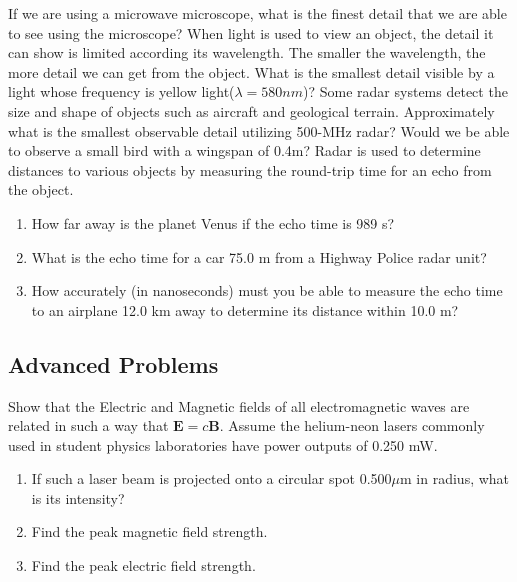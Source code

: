 \documentclass[11pt,addpoints]{exam}
\begin{document}
	\begin{questions}
		\question If we are using a microwave microscope, what is the finest detail that we are able to see using the microscope?
		\question When light is used to view an object, the detail it can show is limited according its wavelength. The smaller the wavelength, the more detail we can get from the object. What is the smallest detail visible by a light whose frequency is yellow light($\lambda=580nm$)? 
		\question Some radar systems detect the size and shape of objects such as aircraft and geological terrain. Approximately what is the smallest observable detail utilizing 500-MHz radar? Would we be able to observe a small bird with a wingspan of 0.4m?
		\question Radar is used to determine distances to various objects by measuring the round-trip time for an echo from the object.
		\begin{enumerate}[label=(\alph*)]
			\item How far away is the planet Venus if the echo time is 989 s?
			\item What is the echo time for a car 75.0 m from a Highway Police radar unit?
			\item How accurately (in nanoseconds) must you be able to measure the echo time to an airplane 12.0 km away to determine its distance within 10.0 m?
		\end{enumerate}
		\subsection*{Advanced Problems}
		\question Show that the Electric and Magnetic fields of all electromagnetic waves are related in such a way that $\textbf{E}=c\textbf{B}$.
		\question Assume the helium-neon lasers commonly used in student physics laboratories have power outputs of 0.250 mW.
		\begin{enumerate}[label=(\alph*)]
			\item If such a laser beam is projected onto a circular spot 0.500$\mu$m in radius, what is its intensity?
			\item Find the peak magnetic field strength.
			\item Find the peak electric field strength.
		\end{enumerate}
	\end{questions}		
\end{document}
